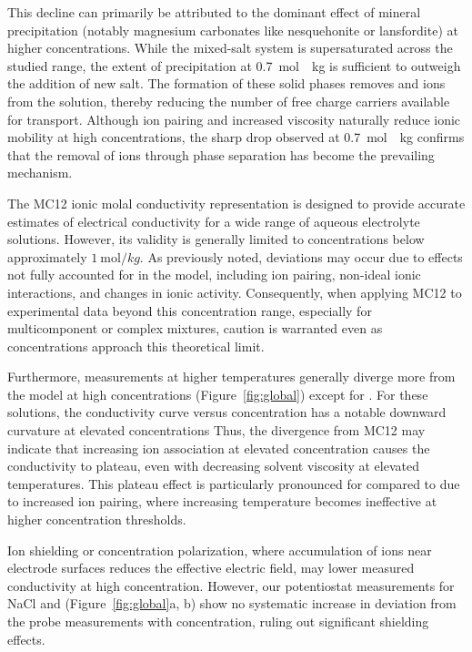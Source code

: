 \documentclass[journal=aesccq,manuscript=article]{achemso}
\begin{document}
This decline can primarily be attributed to the dominant effect of mineral precipitation (notably magnesium carbonates like nesquehonite or lansfordite) at higher concentrations. While the mixed-salt system is supersaturated across the studied range, the extent of precipitation at \SI{0.7}{mol \per kg} is sufficient to outweigh the addition of new salt. The formation of these solid phases removes  and  ions from the solution, thereby reducing the number of free charge carriers available for transport. Although ion pairing and increased viscosity naturally reduce ionic mobility at high concentrations, the sharp drop observed at \SI{0.7}{mol \per kg} confirms that the removal of ions through phase separation has become the prevailing mechanism.


The MC12\cite{McCleskey2012} ionic molal conductivity representation is designed to provide accurate estimates of electrical conductivity for a wide range of aqueous electrolyte solutions. 
However, its validity is generally limited to concentrations below approximately $\SI{1}{\mol \per kg}$\cite{McCleskey_2011,McCleskey2012}. 
As previously noted, deviations may occur due to effects not fully accounted for in the model, including ion pairing, non-ideal ionic interactions, and changes in ionic activity. 
Consequently, when applying MC12 to experimental data beyond this concentration range, especially for multicomponent or complex mixtures, caution is warranted even as concentrations approach this theoretical limit.


Furthermore, measurements at higher temperatures generally diverge more from the model at high concentrations (Figure~\ref{fig:global}) except for . 
For these solutions, the conductivity curve versus concentration has a notable downward curvature at elevated concentrations
Thus, the divergence from MC12 may indicate that increasing ion association at elevated concentration causes the conductivity to plateau, even with decreasing solvent viscosity at elevated temperatures.
This plateau effect is particularly pronounced for  compared to  due to increased ion pairing, where increasing temperature becomes ineffective at higher concentration thresholds.

Ion shielding or concentration polarization, where accumulation of ions near electrode surfaces reduces the effective electric field, may lower measured conductivity at high concentration.
However, our potentiostat measurements for NaCl and  (Figure~\ref{fig:global}a, b) show no systematic increase in deviation from the probe measurements with concentration, ruling out significant shielding effects. 
\end{document}
